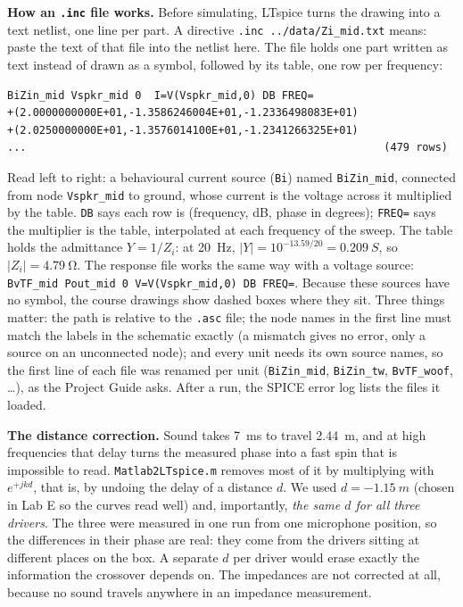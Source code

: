 \documentclass[a4paper,10pt]{article}
\newcommand{\file}[1]{\nolinkurl{#1}}
\begin{document}
\textbf{How an \file{.inc} file works.} Before simulating, LTspice turns the drawing into a text
netlist, one line per part. A directive \file{.inc ../data/Zi_mid.txt} means: paste the text of that
file into the netlist here. The file holds one part written as text instead of drawn as a symbol,
followed by its table, one row per frequency:
\begin{Verbatim}[fontsize=\footnotesize]
BiZin_mid Vspkr_mid 0  I=V(Vspkr_mid,0) DB FREQ=
+(2.0000000000E+01,-1.3586246004E+01,-1.2336498083E+01)
+(2.0250000000E+01,-1.3576014100E+01,-1.2341266325E+01)
...                                                        (479 rows)
\end{Verbatim}
Read left to right: a behavioural current source (\file{Bi}) named \file{BiZin_mid}, connected from
node \file{Vspkr_mid} to ground, whose current is the voltage across it multiplied by the table. \file{DB}
says each row is (frequency, dB, phase in degrees); \file{FREQ=} says the multiplier is the table,
interpolated at each frequency of the sweep. The table holds the admittance $Y = 1/Z_i$: at \SI{20}{Hz},
$|Y| = 10^{-13.59/20} = \SI{0.209}{S}$, so $|Z_i| = \SI{4.79}{\ohm}$. The response file works the same way
with a voltage source: \file{BvTF_mid Pout_mid 0 V=V(Vspkr_mid,0) DB FREQ=}. Because these sources have
no symbol, the course drawings show dashed boxes where they sit. Three things matter:
the path is relative to the \file{.asc} file; the node names in the first line must match the labels in
the schematic exactly (a mismatch gives no error, only a source on an unconnected node); and every
unit needs its own source names, so the first line of each file was renamed per unit
(\file{BiZin_mid}, \file{BiZin_tw}, \file{BvTF_woof}, \ldots), as the Project Guide asks. After a run,
the SPICE error log lists the files it loaded.

\textbf{The distance correction.} Sound takes \SI{7}{ms} to travel \SI{2.44}{m}, and at high
frequencies that delay turns the measured phase into a fast spin that is impossible to read.
\file{Matlab2LTspice.m} removes most of it by multiplying with $e^{+jkd}$, that is, by
undoing the delay of a distance $d$. We used $d = \SI{-1.15}{m}$ (chosen in Lab E so the curves read
well) and, importantly, \emph{the same $d$ for all three drivers}. The three were measured in one run
from one microphone position, so the differences in their phase are real: they come from the
drivers sitting at different places on the box. A separate $d$ per driver would erase exactly the
information the crossover depends on. The impedances are not corrected at all, because no sound
travels anywhere in an impedance measurement.
\end{document}
